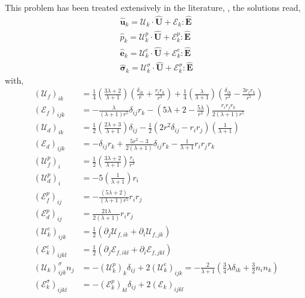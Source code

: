 This problem has been treated extensively in the literature, \citet{pozrikidis1992boundary,leal2007advanced,kim2013microhydrodynamics}, the solutions read, 
\begin{align}
    \hat{\textbf{u}}_k = \mathcal{U}_k\cdot \hat{\textbf{U}}+ \mathcal{E}_k : \hat{\textbf{E}}\\
    \hat{p}_k = \mathcal{U}_k^p\cdot \hat{\textbf{U}}+ \mathcal{E}_k^p : \hat{\textbf{E}}\\
    \hat{\textbf{e}}_k = \mathcal{U}_k^e\cdot \hat{\textbf{U}}+ \mathcal{E}_k^e : \hat{\textbf{E}}\\
    \hat{\bm\sigma}_k = \mathcal{U}_k^\sigma\cdot \hat{\textbf{U}}+ \mathcal{E}_k^\sigma : \hat{\textbf{E}}
    \label{eq:solution_hat}
\end{align}
with, 
\begin{align*}
    (\mathcal{U}_{f})_{ik} &= 
     \frac{1}{4}\left(\frac{3\lambda + 2}{\lambda +1}\right)
    \left(\frac{\delta_{ik}}{r} + \frac{r_ir_k}{r^3}\right) 
    + 
    \frac{1}{4}\left(\frac{\lambda}{\lambda +1}\right)
    \left(\frac{\delta_{ik}}{r^3} - \frac{3r_ir_k}{r^5}\right)  \\
    (\mathcal{E}_{f})_{ijk}
    &=
    -\frac{\lambda}{(\lambda + 1)r^5} \delta_{ij} r_k
    -\left(
        5\lambda +2
        - \frac{5\lambda}{r^2}
        \right) 
    \frac{r_ir_jr_k}{2(\lambda+1)r^5}\\
    (\mathcal{U}_{d})_{ik} &= 
    \frac{1}{2}\left(\frac{2\lambda +3}{\lambda +1}\right)\delta_{ij}
    -\frac{1}{2} (2r^2 \delta_{ij} - r_ir_j)
    \left(\frac{1}{\lambda +1}\right)\\
    (\mathcal{E}_{d})_{ijk}
    &= -\delta_{ij} r_k
    + \frac{5r^2 -3}{2(\lambda +1)} \delta_{ij} r_k
    - \frac{1}{\lambda+1}r_ir_jr_k\\
    (\mathcal{U}_f^p)_i &= 
      \frac{1}{2}\left(\frac{3\lambda + 2}{\lambda +1}\right) \frac{r_i}{r^3}\\
     (\mathcal{U}_d^p)_i &= 
    - 5 \left(\frac{1}{\lambda +1}\right) r_i\\
    (\mathcal{E}_f^p)_{ij} &= - \frac{(5\lambda+2)}{(\lambda+1)r^5}r_ir_j\\
    (\mathcal{E}_d^p)_{ij} &= \frac{21\lambda}{2(\lambda+1)} r_ir_j\\
    (\mathcal{U}_k^e)_{ijk}
    &= 
    \frac{1}{2}(
    \partial_j 
    \mathcal{U}_{f,ik}
    + 
    \partial_i 
    \mathcal{U}_{f,jk}
    )\\
    (\mathcal{E}_k^e)_{ijkl}
    &= 
    \frac{1}{2}(
    \partial_j 
    \mathcal{E}_{f,ikl}
    + 
    \partial_i 
    \mathcal{E}_{f,jkl}
    )\\
    (\mathcal{U}_k)_{ijk}^\sigma  n_j 
    &= 
     - (\mathcal{U}_k^p)_{k}\delta_{ij}
     + 2(\mathcal{U}_k^e)_{ijk}
     = - \frac{2}{\lambda +1}\left(
         \frac{3}{4}\lambda\delta_{ik} 
         + \frac{3}{2} n_in_k
     \right)
     \\
     (\mathcal{E}_k^\sigma)_{ijkl}
     &=
     - (\mathcal{E}_k^p)_{kl}\delta_{ij}
     + 2(\mathcal{E}_k)_{ijkl}
\end{align*}

